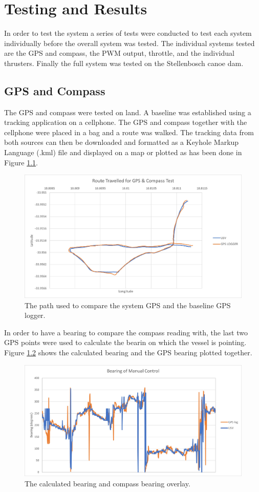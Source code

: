 \chapter{Testing and Results}
In order to test the system a series of tests were conducted to test each system individually before the overall system was tested. The individual systems tested are the GPS and compass, the PWM output, throttle, and the individual thrusters. Finally the full system was tested on the Stellenbosch canoe dam. 
\section{GPS and Compass}
The GPS and compass were tested on land. A baseline was established using a tracking application on a cellphone. The GPS and compass together with the cellphone were placed in a bag and a route was walked. The tracking data from both sources can then be downloaded and formatted as a Keyhole Markup Language (.kml) file and displayed on a map or plotted as has been done in Figure \ref{fig:4:GPSMap}.\par
\begin{figure}
	\begin{center}
		\includegraphics[width=0.8\linewidth]{figures/graphGPSMap.jpg}
		\caption{The path used to compare the system GPS and the baseline GPS logger.}
		\label{fig:4:GPSMap}
	\end{center}
\end{figure}
In order to have a bearing to compare the compass reading with, the last two GPS points were used to calculate the bearin on which the vessel is pointing. Figure \ref{fig:4:bearingTest} shows the calculated bearing and the GPS bearing plotted together.\par
\begin{figure}
	\begin{center}
		\includegraphics[width=0.8\linewidth]{figures/graphBearingManual.jpg}
		\caption{The calculated bearing and compass bearing overlay.}
		\label{fig:4:bearingTest}
	\end{center}
\end{figure}
